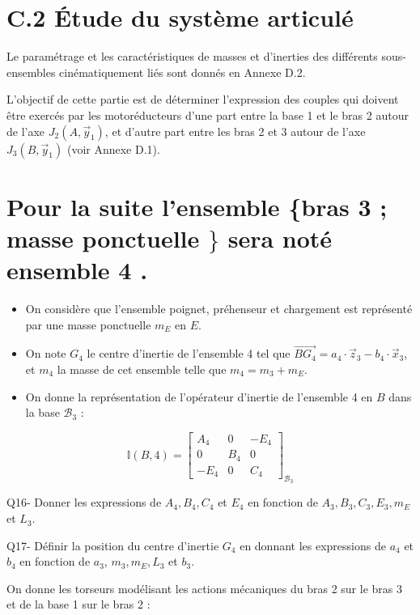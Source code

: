 \section*{C.2 Étude du système articulé}
Le paramétrage et les caractéristiques de masses et d'inerties des différents sous-ensembles cinématiquement liés sont donnés en Annexe D.2.

L'objectif de cette partie est de déterminer l'expression des couples qui doivent être exercés par les motoréducteurs d'une part entre la base 1 et le bras 2 autour de l'axe $J_{2}\left(A, \vec{y}_{1}\right)$, et d'autre part entre les bras 2 et 3 autour de l'axe $J_{3}\left(B, \vec{y}_{1}\right)$ (voir Annexe D.1).

\section*{Pour la suite l'ensemble \{bras 3 ; masse ponctuelle $\}$ sera noté ensemble 4 .}
\begin{itemize}
  \item On considère que l'ensemble poignet, préhenseur et chargement est représenté par une masse ponctuelle $m_{E}$ en $E$.

  \item On note $G_{4}$ le centre d'inertie de l'ensemble 4 tel que $\overrightarrow{B G_{4}}=a_{4} \cdot \vec{z}_{3}-b_{4} \cdot \vec{x}_{3}$, et $m_{4}$ la masse de cet ensemble telle que $m_{4}=m_{3}+m_{E}$.

  \item On donne la représentation de l'opérateur d'inertie de l'ensemble 4 en $B$ dans la base $\mathcal{B}_{3}$ :

\end{itemize}

$$
\mathbb{I}(B, 4)=\left[\begin{array}{ccc}
A_{4} & 0 & -E_{4} \\
0 & B_{4} & 0 \\
-E_{4} & 0 & C_{4}
\end{array}\right]_{\mathcal{B}_{3}}
$$

Q16- Donner les expressions de $A_{4}, B_{4}, C_{4}$ et $E_{4}$ en fonction de $A_{3}, B_{3}, C_{3}, E_{3}, m_{E}$ et $L_{3}$.

Q17- Définir la position du centre d'inertie $G_{4}$ en donnant les expressions de $a_{4}$ et $b_{4}$ en fonction de $a_{3}$, $m_{3}, m_{E}, L_{3}$ et $b_{3}$.

On donne les torseurs modélisant les actions mécaniques du bras 2 sur le bras 3 et de la base 1 sur le bras 2 :

